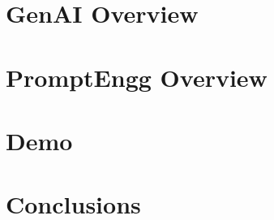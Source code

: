 \section[GenAI]{GenAI Overview}


% 

\section[PromptEngg]{PromptEngg Overview}


% 

\section[Demo]{Demo}


\section[Concl]{Conclusions}
